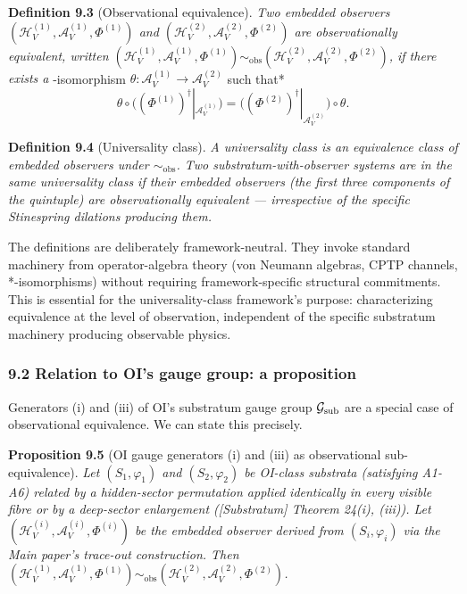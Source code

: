 \documentclass[
]{article}
\begin{document}
\textbf{Definition 9.3} (Observational equivalence). \emph{Two embedded
observers \((\mathcal{H}_V^{(1)}, \mathcal{A}_V^{(1)}, \Phi^{(1)})\) and
\((\mathcal{H}_V^{(2)}, \mathcal{A}_V^{(2)}, \Phi^{(2)})\) are
observationally equivalent, written
\((\mathcal{H}_V^{(1)}, \mathcal{A}_V^{(1)}, \Phi^{(1)}) \sim_{\mathrm{obs}} (\mathcal{H}_V^{(2)}, \mathcal{A}_V^{(2)}, \Phi^{(2)})\),
if there exists a }-isomorphism
\(\theta: \mathcal{A}_V^{(1)} \to \mathcal{A}_V^{(2)}\) such that*
\[\theta\circ\big((\Phi^{(1)})^\dagger|_{\mathcal A_V^{(1)}}\big)=\big((\Phi^{(2)})^\dagger|_{\mathcal A_V^{(2)}}\big)\circ\theta.\]

\textbf{Definition 9.4} (Universality class). \emph{A universality class
is an equivalence class of embedded observers under
\(\sim_{\mathrm{obs}}\). Two substratum-with-observer systems are in the
same universality class if their embedded observers (the first three
components of the quintuple) are observationally equivalent ---
irrespective of the specific Stinespring dilations producing them.}

The definitions are deliberately framework-neutral. They invoke standard
machinery from operator-algebra theory (von Neumann algebras, CPTP
channels, *-isomorphisms) without requiring framework-specific
structural commitments. This is essential for the universality-class
framework's purpose: characterizing equivalence at the level of
observation, independent of the specific substratum machinery producing
observable physics.

\hypertarget{relation-to-ois-gauge-group-a-proposition}{%
\subsubsection{9.2 Relation to OI's gauge group: a
proposition}\label{relation-to-ois-gauge-group-a-proposition}}

Generators (i) and (iii) of OI's substratum gauge group
\(\mathcal{G}_{\rm sub}\) are a special case of observational
equivalence. We can state this precisely.

\textbf{Proposition 9.5} (OI gauge generators (i) and (iii) as
observational sub-equivalence). \emph{Let \((S_1, \varphi_1)\) and
\((S_2, \varphi_2)\) be OI-class substrata (satisfying A1-A6) related by
a hidden-sector permutation applied identically in every visible fibre
or by a deep-sector enlargement ({[}Substratum{]} Theorem 24(i), (iii)).
Let \((\mathcal{H}_V^{(i)}, \mathcal{A}_V^{(i)}, \Phi^{(i)})\) be the
embedded observer derived from \((S_i, \varphi_i)\) via the Main paper's
trace-out construction. Then
\((\mathcal{H}_V^{(1)}, \mathcal{A}_V^{(1)}, \Phi^{(1)}) \sim_{\mathrm{obs}} (\mathcal{H}_V^{(2)}, \mathcal{A}_V^{(2)}, \Phi^{(2)})\).}
\end{document}
